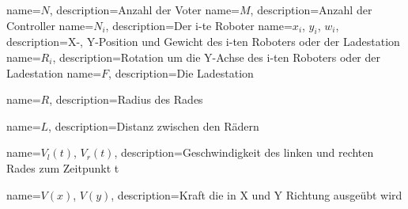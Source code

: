 {
       name={\ensuremath{N}},
       description={Anzahl der Voter}
}
{
       name={\ensuremath{M}},
       description={Anzahl der Controller}
}
{
       name={\ensuremath{N_i}},
       description={Der i-te Roboter}
}
{
       name={\ensuremath{x_i}, \ensuremath{y_i}, \ensuremath{w_i}},
       description={X-, Y-Position und Gewicht des i-ten Roboters oder der Ladestation}
}
{
       name={\ensuremath{R_i}},
       description={Rotation um die Y-Achse des i-ten Roboters oder der Ladestation}
}
{
       name={\ensuremath{F}},
       description={Die Ladestation}
}

{
       name={\ensuremath{R}},
       description={Radius des Rades}
}

{
       name={\ensuremath{L}},
       description={Distanz zwischen den R{\"{a}}dern}
}

{
       name={\ensuremath{V_l(t)}, \ensuremath{V_r(t)}},
       description={Geschwindigkeit des linken und rechten Rades zum Zeitpunkt t}
}

{
       name={\ensuremath{V(x)}, \ensuremath{V(y)}},
       description={Kraft die in X und Y Richtung ausge{\"{u}}bt wird}
}
